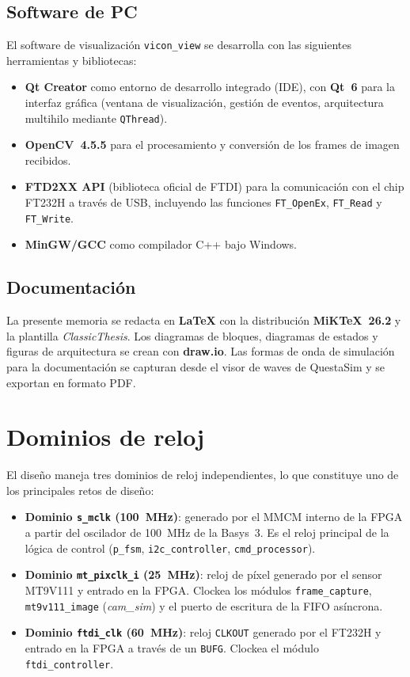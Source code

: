 \documentclass[../main.tex]{subfiles}
\begin{document}
\subsection{Software de PC}
 
El software de visualización \texttt{vicon\_view} se desarrolla con las siguientes herramientas y bibliotecas:
 
\begin{itemize}
    \item \textbf{Qt Creator} como entorno de desarrollo integrado (IDE), con \textbf{Qt~6} para la interfaz gráfica (ventana de visualización, gestión de eventos, arquitectura multihilo mediante \texttt{QThread}).
    \item \textbf{OpenCV~4.5.5} para el procesamiento y conversión de los frames de imagen recibidos.
    \item \textbf{FTD2XX API} (biblioteca oficial de FTDI) para la comunicación con el chip FT232H a través de USB, incluyendo las funciones \texttt{FT\_OpenEx}, \texttt{FT\_Read} y \texttt{FT\_Write}.
    \item \textbf{MinGW/GCC} como compilador C++ bajo Windows.
\end{itemize}
 
\subsection{Documentación}
 
La presente memoria se redacta en \textbf{\LaTeX} con la distribución \textbf{MiKTeX~26.2} y la plantilla \textit{ClassicThesis}. Los diagramas de bloques, diagramas de estados y figuras de arquitectura se crean con \textbf{draw.io}. Las formas de onda de simulación para la documentación se capturan desde el visor de waves de QuestaSim y se exportan en formato PDF.
\section{Dominios de reloj}

El diseño maneja tres dominios de reloj independientes, lo que constituye uno de los principales retos de diseño:

\begin{itemize}
    \item \textbf{Dominio \texttt{s\_mclk} (100~MHz)}: generado por el MMCM interno de la FPGA a partir del oscilador de 100~MHz de la Basys~3. Es el reloj principal de la lógica de control (\texttt{p\_fsm}, \texttt{i2c\_controller}, \texttt{cmd\_processor}).
    \item \textbf{Dominio \texttt{mt\_pixclk\_i} (25~MHz)}: reloj de píxel generado por el sensor MT9V111 y entrado en la FPGA. Clockea los módulos \texttt{frame\_capture}, \texttt{mt9v111\_image} (\textit{cam\_sim}) y el puerto de escritura de la FIFO asíncrona.
    \item \textbf{Dominio \texttt{ftdi\_clk} (60~MHz)}: reloj \texttt{CLKOUT} generado por el FT232H y entrado en la FPGA a través de un \texttt{BUFG}. Clockea el módulo \texttt{ftdi\_controller}.
\end{itemize}
\end{document}
